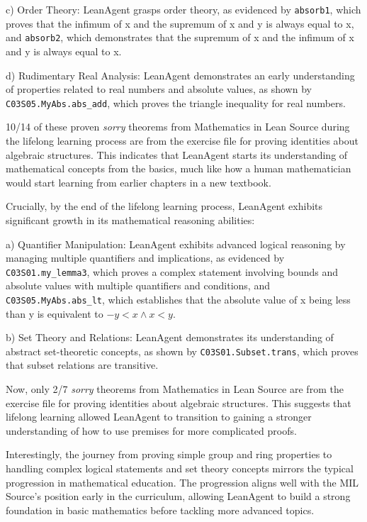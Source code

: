 \documentclass{article} %
\begin{document}
c) Order Theory:
LeanAgent grasps order theory, as evidenced by \texttt{absorb1}, which proves that the infimum of x and the supremum of x and y is always equal to x, and \texttt{absorb2}, which demonstrates that the supremum of x and the infimum of x and y is always equal to x.

d) Rudimentary Real Analysis:
LeanAgent demonstrates an early understanding of properties related to real numbers and absolute values, as shown by \texttt{C03S05.MyAbs.abs\_add}, which proves the triangle inequality for real numbers.

10/14 of these proven \textit{sorry} theorems from Mathematics in Lean Source during the lifelong learning process are from the exercise file for proving identities about algebraic structures. This indicates that LeanAgent starts its understanding of mathematical concepts from the basics, much like how a human mathematician would start learning from earlier chapters in a new textbook. 

Crucially, by the end of the lifelong learning process, LeanAgent exhibits significant growth in its mathematical reasoning abilities:

a) Quantifier Manipulation:
LeanAgent exhibits advanced logical reasoning by managing multiple quantifiers and implications, as evidenced by \texttt{C03S01.my\_lemma3}, which proves a complex statement involving bounds and absolute values with multiple quantifiers and conditions, and \texttt{C03S05.MyAbs.abs\_lt}, which establishes that the absolute value of x being less than y is equivalent to $-y < x \land x < y$.

b) Set Theory and Relations:
LeanAgent demonstrates its understanding of abstract set-theoretic concepts, as shown by \texttt{C03S01.Subset.trans}, which proves that subset relations are transitive.

Now, only 2/7 \textit{sorry} theorems from Mathematics in Lean Source are from the exercise file for proving identities about algebraic structures. This suggests that lifelong learning allowed LeanAgent to transition to gaining a stronger understanding of how to use premises for more complicated proofs.


Interestingly, the journey from proving simple group and ring properties to handling complex logical statements and set theory concepts mirrors the typical progression in mathematical education. The progression aligns well with the MIL Source's position early in the curriculum, allowing LeanAgent to build a strong foundation in basic mathematics before tackling more advanced topics.
\end{document}
